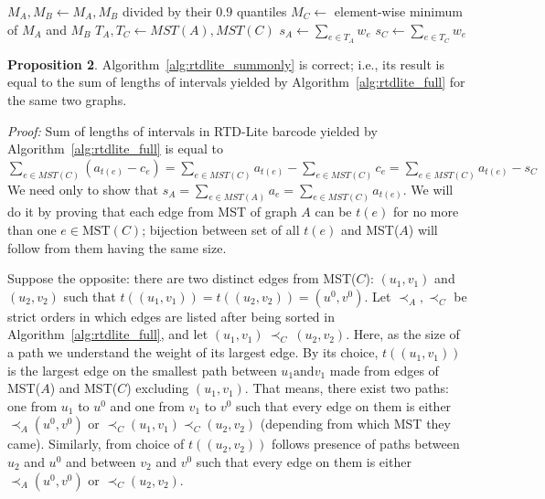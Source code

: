 \documentclass[twoside]{article}
\begin{document}
\begin{algorithm}%
	\caption{RTD-Lite returning only sum of intervals lengths} 
    \label{alg:rtdlite_summonly}

	\begin{algorithmic}%
	\State $M_A, M_B \leftarrow M_A, M_B$ divided by their $0.9$ quantiles
	\State $M_C \leftarrow $ element-wise minimum of $M_A$ and $M_B$
    \State $T_A, T_C \leftarrow MST(A), MST(C)$
    \State $s_A \leftarrow \sum_{e \in T_A} w_e$
    \State $s_C \leftarrow \sum_{e \in T_C} w_e$
	\EndProcedure
	\end{algorithmic}
\end{algorithm}

\textbf{Proposition 2}. Algorithm~\ref{alg:rtdlite_summonly} is correct; i.e., its result is equal to the sum of lengths of intervals yielded by Algorithm~\ref{alg:rtdlite_full} for the same two graphs.

\textit{Proof: } Sum of lengths of intervals in RTD-Lite barcode yielded by Algorithm~\ref{alg:rtdlite_full} is equal to $\sum_{e \in MST(C)}\left(a_{t(e)} - c_e \right) = \sum_{e \in MST(C)}a_{t(e)} - \sum_{e \in MST(C)} c_e = \sum_{e \in MST(C)}a_{t(e)} - s_C$
We need only to show that $s_A = \sum_{e\in MST(A)}a_e = \sum_{e \in MST(C)}a_{t(e)}$. We will do it by proving that each edge from MST of graph $A$ can be $t(e)$ for no more than one $e \in \text{MST}(C)$; bijection between set of all $t(e)$ and MST($A$) will follow from them having the same size.

Suppose the opposite: there are two distinct edges from MST($C$): $(u_1, v_1)$ and $(u_2, v_2)$ such that $t((u_1, v_1)) = t((u_2, v_2)) = (u^0, v^0)$. Let $\prec_A, \prec_C$ be strict orders in which edges 
are listed after being sorted in Algorithm~\ref{alg:rtdlite_full}, and let $(u_1, v_1)~\prec_C~(u_2, v_2)$. Here, as the size of a path we understand the weight of its largest edge.
By its choice, $t((u_1, v_1))$ is the largest edge on the smallest path between $u_1 \text{and} v_1$ made from edges of MST($A$)  and MST($C$) excluding $(u_1, v_1)$.  
That means, there exist two paths: one from $u_1$ to $u^0$ and one from $v_1$ to $v^0$ such that every edge on them is either $\prec_A (u^0, v^0)$ or $\prec_C (u_1, v_1) \prec_C (u_2, v_2)$ (depending from which MST they came). 
Similarly, from choice of $t((u_2, v_2))$ follows presence of paths between $u_2$ and $u^0$ and between $v_2$ and $v^0$ such that every edge on them is either $\prec_A (u^0, v^0)$ or $\prec_C (u_2, v_2)$.
\end{document}
